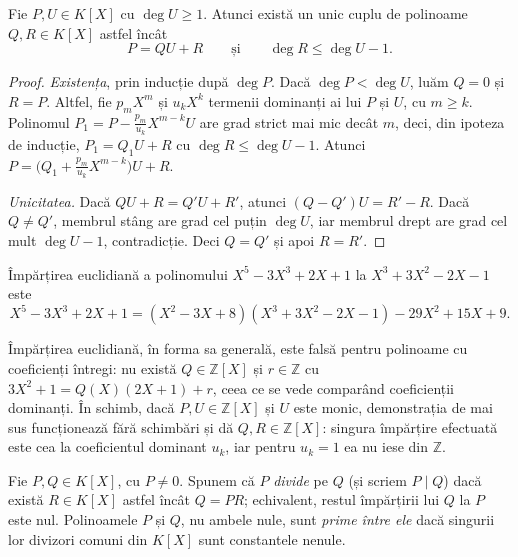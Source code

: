 \begin{teorema}\label{teo:impartire}
Fie $P, U \in K[X]$ cu $\deg U \ge 1$. Atunci există un unic cuplu de polinoame $Q, R \in K[X]$ astfel încât
\[
P = QU + R \qquad \text{și} \qquad \deg R \le \deg U - 1.
\]
\end{teorema}

\begin{proof}
\emph{Existența}, prin inducție după $\deg P$. Dacă $\deg P < \deg U$, luăm $Q = 0$ și $R = P$. Altfel, fie $p_m X^m$ și $u_k X^k$ termenii dominanți ai lui $P$ și $U$, cu $m \ge k$. Polinomul $P_1 = P - \frac{p_m}{u_k} X^{m-k} U$ are grad strict mai mic decât $m$, deci, din ipoteza de inducție, $P_1 = Q_1 U + R$ cu $\deg R \le \deg U - 1$. Atunci $P = \bigl(Q_1 + \frac{p_m}{u_k} X^{m-k}\bigr) U + R$.

\emph{Unicitatea.} Dacă $QU + R = Q'U + R'$, atunci $(Q - Q')U = R' - R$. Dacă $Q \neq Q'$, membrul stâng are grad cel puțin $\deg U$, iar membrul drept are grad cel mult $\deg U - 1$, contradicție. Deci $Q = Q'$ și apoi $R = R'$.
\end{proof}

\begin{exemplu}
Împărțirea euclidiană a polinomului $X^5 - 3X^3 + 2X + 1$ la $X^3 + 3X^2 - 2X - 1$ este
\[
X^5 - 3X^3 + 2X + 1 = (X^2 - 3X + 8)(X^3 + 3X^2 - 2X - 1) - 29X^2 + 15X + 9.
\]
\end{exemplu}

\begin{observatie}
Împărțirea euclidiană, în forma sa generală, este falsă pentru polinoame cu coeficienți întregi: nu există $Q \in \mathbb{Z}[X]$ și $r\in\mathbb{Z}$ cu $3X^2 + 1 = Q(X)(2X + 1)+r$, ceea ce se vede comparând coeficienții dominanți. În schimb, dacă $P, U \in \mathbb{Z}[X]$ și $U$ este monic, demonstrația de mai sus funcționează fără schimbări și dă $Q, R \in \mathbb{Z}[X]$: singura împărțire efectuată este cea la coeficientul dominant $u_k$, iar pentru $u_k = 1$ ea nu iese din $\mathbb{Z}$.
\end{observatie}

\begin{definitie}
Fie $P, Q \in K[X]$, cu $P \neq 0$. Spunem că $P$ \emph{divide} pe $Q$ (și scriem $P\mid Q$) dacă există $R \in K[X]$ astfel încât $Q = PR$; echivalent, restul împărțirii lui $Q$ la $P$ este nul. Polinoamele $P$ și $Q$, nu ambele nule, sunt \emph{prime între ele} dacă singurii lor divizori comuni din $K[X]$ sunt constantele nenule.
\end{definitie}

